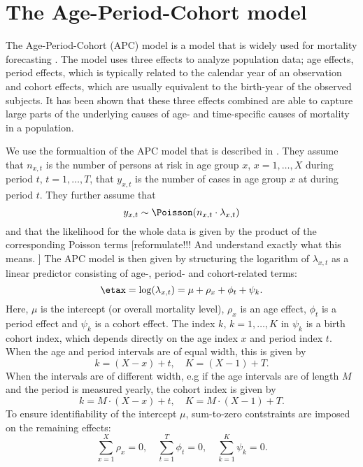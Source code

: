 \section{The Age-Period-Cohort model}
The Age-Period-Cohort (APC) model is a model that is widely used for mortality forecasting \cite{rieblerHeld2010}. The model uses three effects to analyze population data; age effects, period effects, which is typically related to the calendar year of an observation and cohort effects, which are usually equivalent to the birth-year of the observed subjects. It has been shown that these three effects combined are able to capture large parts of the underlying causes of age- and time-specific causes of mortality in a population. 

We use the formualtion of the APC model that is described in \citet{rieblerHeld2010}. 
They assume that $n_{x,t}$ is the number of persons at risk in age group $x$, $x = 1,\ldots,X$ during period $t$, $t = 1,\ldots,T$, that $y_{x,t}$ is the number of cases in age group $x$ at during period $t$. They further assume that 
\begin{equation}
    y_{x,t} \sim \Poisson(n_{x,t}\cdot \lambda_{x,t})
\end{equation}
and that the likelihood for the whole data is given by the product of the corresponding Poisson terms [reformulate!!! And understand exactly what this means. ]
The APC model is then given by structuring the logarithm of $\lambda_{x,t}$ as a linear predictor consisting of age-, period- and cohort-related terms:
\begin{equation}
    \etax = \log(\lambda_{x,t}) = \mu + \rho_x + \phi_t + \psi_k.
    \label{eq:APCmodel}
\end{equation}
Here, $\mu$ is the intercept (or overall mortality level), $\rho_x$ is an age effect, $\phi_t$ is a period effect and $\psi_k$ is a cohort effect. The index $k$, $k = 1,\ldots,K$ in $\psi_k$ is a birth cohort index, which depends directly on the age index $x$ and period index $t$. When the age and period intervals are of equal width, this is given by
\begin{equation*}
    k = (X - x) + t, \quad K = (X - 1) + T.
\end{equation*}
When the intervals are of different width, e.g if the age intervals are of length $M$ and the period is measured yearly, the cohort index is given by
\begin{equation}
    k = M \cdot (X - x) + t, \quad K = M \cdot (X - 1) + T.
    \label{eq:cohortIndex}
\end{equation}
To ensure identifiability of the intercept $\mu$, sum-to-zero contstraints are imposed on the remaining effects:
\begin{equation}
    \sum_{x = 1}^{X}\rho_x = 0, \quad \sum_{t = 1}^T\phi_t = 0, \quad \sum_{k = 1}^K \psi_k = 0. 
    \label{eq:APCconstraints}
\end{equation}